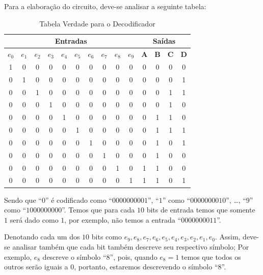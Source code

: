 \documentclass[12pt]{article}
\begin{document}
Para a elaboração do circuito, deve-se analisar a seguinte tabela:
\begin{table}[H]
    \centering
    \caption{Tabela Verdade para o Decodificador}
    \begin{tabular}{|c|c|c|c|c|c|c|c|c|c||c|c|c|c|}\hline
    \multicolumn{10}{|c||}{Entradas} & \multicolumn{4}{|c|}{Saídas} \\\hline
    \textbf{$e_{0}$} & \textbf{$e_{1}$} & \textbf{$e_{2}$} & \textbf{$e_{3}$} & \textbf{$e_{4}$} & \textbf{$e_{5}$} & \textbf{$e_{6}$} & \textbf{$e_{7}$} & \textbf{$e_{8}$} & \textbf{$e_{9}$} & \textbf{A} & \textbf{B} & \textbf{C} & \textbf{D} \\\hline
    1 & 0 & 0 & 0 & 0 & 0 & 0 & 0 & 0 & 0 & 0 & 0 & 0 & 0\\\hline
    0 & 1 & 0 & 0 & 0 & 0 & 0 & 0 & 0 & 0 & 0 & 0 & 0 & 1\\\hline
    0 & 0 & 1 & 0 & 0 & 0 & 0 & 0 & 0 & 0 & 0 & 0 & 1 & 1 \\\hline
    0 & 0 & 0 & 1 & 0 & 0 & 0 & 0 & 0 & 0 & 0 & 0 & 1 & 0\\\hline
    0 & 0 & 0 & 0 & 1 & 0 & 0 & 0 & 0 & 0 & 0 & 1 & 1 & 0\\\hline
    0 & 0 & 0 & 0 & 0 & 1 & 0 & 0 & 0 & 0 & 0 & 1 & 1 & 1\\\hline
    0 & 0 & 0 & 0 & 0 & 0 & 1 & 0 & 0 & 0 & 0 & 1 & 0 & 1\\\hline
    0 & 0 & 0 & 0 & 0 & 0 & 0 & 1 & 0 & 0 & 0 & 1 & 0 & 0\\\hline
    0 & 0 & 0 & 0 & 0 & 0 & 0 & 0 & 1 & 0 & 1 & 1 & 0 & 0\\\hline
    0 & 0 & 0 & 0 & 0 & 0 & 0 & 0 & 0 & 1 & 1 & 1 & 0 & 1\\\hline
    \end{tabular}\label{tab:tabela_and}
\end{table}

Sendo que ``$0$'' é codificado como ``$0000000001$'', ``$1$'' como
``$0000000010$'', \ldots, ``$9$'' como ``$1000000000$''. Temos que para cada
$10$ bits de entrada temos que somente $1$ será dado como $1$, por exemplo, não
temos a entrada ``$0000000011$''.

Denotando cada um dos $10$ bits como
$e_{9},e_{8},e_{7},e_{6},e_{5},e_{4},e_{3},e_{2},e_{1},e_{0}$. Assim, deve-se
analisar também que cada bit também descreve seu respectivo símbolo; Por
exemplo, $e_{8}$ descreve o símbolo ``$8$'', pois, quando $e_{8}=1$ temos que
todos os outros serão iguais a $0$, portanto, estaremos descrevendo o símbolo
``$8$''.
\end{document}
